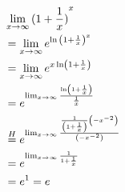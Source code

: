 \begin{align*}
	 & \lim_{x \rightarrow{} \infty} {(1 + \frac{1}{x})}^x                                                                                           \\
	 & = \lim_{x \rightarrow{} \infty} e^{\ln {\left( 1 + \frac{1}{x} \right)}^x}                                                                    \\
	 & = \lim_{x \rightarrow{} \infty} e^{x \ln \left( 1 + \frac{1}{x} \right)}                                                                      \\
	 & = e^{\lim_{x \rightarrow{} \infty} \frac{\ln \left( 1 + \frac{1}{x} \right)}{\frac{1}{x}}}                                                    \\
	 & \overset{H}{=} e^{\lim_{x \rightarrow{} \infty} \frac{\frac{1}{\left(1 + \frac{1}{x}\right)} \left( -x^{-2} \right)}{\left( -x^{-2} \right)}} \\
	 & = e^{\lim_{x \rightarrow{} \infty} \frac{1}{1 + \frac{1}{x}}}                                                                                 \\
	 & = e^1 = e
\end{align*}
